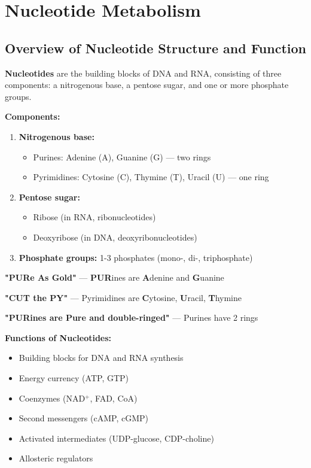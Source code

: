\section{Nucleotide Metabolism}

\subsection{Overview of Nucleotide Structure and Function}

\begin{definition}
\textbf{Nucleotides} are the building blocks of DNA and RNA, consisting of three components: a nitrogenous base, a pentose sugar, and one or more phosphate groups.
\end{definition}

\textbf{Components:}
\begin{enumerate}
    \item \textbf{Nitrogenous base:}
    \begin{itemize}
        \item Purines: Adenine (A), Guanine (G) — two rings
        \item Pyrimidines: Cytosine (C), Thymine (T), Uracil (U) — one ring
    \end{itemize}
    
    \item \textbf{Pentose sugar:}
    \begin{itemize}
        \item Ribose (in RNA, ribonucleotides)
        \item Deoxyribose (in DNA, deoxyribonucleotides)
    \end{itemize}
    
    \item \textbf{Phosphate groups:} 1-3 phosphates (mono-, di-, triphosphate)
\end{enumerate}

\begin{tcolorbox}[colback=blue!5, colframe=blue!70!black, title=\textbf{Mnemonic: Purines vs. Pyrimidines}]
\textbf{"PURe As Gold"} — \textbf{PUR}ines are \textbf{A}denine and \textbf{G}uanine

\textbf{"CUT the PY"} — Pyrimidines are \textbf{C}ytosine, \textbf{U}racil, \textbf{T}hymine

\textbf{"PURines are Pure and double-ringed"} — Purines have 2 rings
\end{tcolorbox}

\textbf{Functions of Nucleotides:}
\begin{itemize}
    \item Building blocks for DNA and RNA synthesis
    \item Energy currency (ATP, GTP)
    \item Coenzymes (NAD$^+$, FAD, CoA)
    \item Second messengers (cAMP, cGMP)
    \item Activated intermediates (UDP-glucose, CDP-choline)
    \item Allosteric regulators
\end{itemize}


